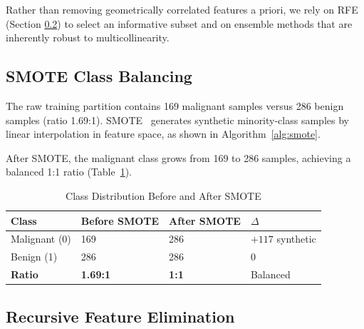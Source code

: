 \documentclass[10pt,letterpaper]{article}
\begin{document}
Rather than removing geometrically correlated features a priori, we rely on RFE (Section
\ref{sec:rfe}) to select an informative subset and on ensemble methods that are inherently
robust to multicollinearity.

\subsection{SMOTE Class Balancing}

The raw training partition contains 169 malignant samples versus 286 benign samples (ratio 1.69:1).
SMOTE~\cite{chawla2002} generates synthetic minority-class samples by linear interpolation in
feature space, as shown in Algorithm~\ref{alg:smote}.

\begin{algorithm}[h]
\caption{SMOTE Synthetic Sample Generation}
\label{alg:smote}
\end{algorithm}

After SMOTE, the malignant class grows from 169 to 286 samples, achieving a balanced 1:1 ratio
(Table~\ref{tab:smote}).

\begin{table}[h]
\centering
\caption{Class Distribution Before and After SMOTE}
\label{tab:smote}
\begin{tabular}{llll}
\toprule
\textbf{Class} & \textbf{Before SMOTE} & \textbf{After SMOTE} & \textbf{$\Delta$} \\
\midrule
Malignant (0) & 169 & 286 & $+117$ synthetic \\
Benign (1)    & 286 & 286 & 0 \\
\textbf{Ratio} & \textbf{1.69:1} & \textbf{1:1} & Balanced \\
\bottomrule
\end{tabular}
\end{table}

\subsection{Recursive Feature Elimination}
\label{sec:rfe}
\end{document}
